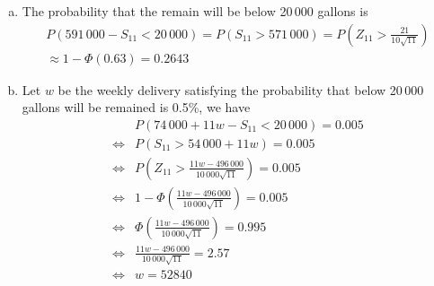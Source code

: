 \documentclass[a4paper,12pt]{article}
\begin{document}
\begin{enumerate}[(a)]
  \item The probability that the remain will be below 20\,000 gallons is
    \begin{multline*}
      P(591\,000 - S_{11} < 20\,000)
      = P(S_{11} > 571\,000)
      = P\left(Z_{11} > \frac{21}{10\sqrt{11}}\right)\\
      \approx 1 - \Phi(0.63) = 0.2643
    \end{multline*}
  \item Let $w$ be the weekly delivery satisfying the probability
    that below 20\,000 gallons will be remained is 0.5\%, we have
    \begin{align*}
      &P(74\,000 + 11w - S_{11} < 20\,000) = 0.005\\
      \iff &P(S_{11} > 54\,000 + 11w) = 0.005\\
      \iff &P\left(Z_{11}>\frac{11w-496\,000}{10\,000\sqrt{11}}\right) = 0.005\\
      \iff &1 - \Phi\left(\frac{11w-496\,000}{10\,000\sqrt{11}}\right) = 0.005\\
      \iff &\Phi\left(\frac{11w-496\,000}{10\,000\sqrt{11}}\right) = 0.995\\
      \iff &\frac{11w-496\,000}{10\,000\sqrt{11}} = 2.57\\
      \iff &w = 52840
    \end{align*}
\end{enumerate}
\end{document}
